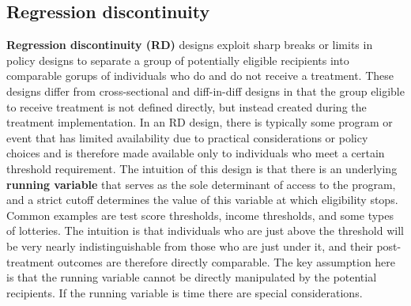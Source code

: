 \subsection{Regression discontinuity}

\textbf{Regression discontinuity (RD)} designs exploit sharp breaks or limits
in policy designs to separate a group of potentially eligible recipients
into comparable gorups of individuals who do and do not receive a treatment.
These designs differ from cross-sectional and diff-in-diff designs
in that the group eligible to receive treatment is not defined directly,
but instead created during the treatment implementation.
In an RD design, there is typically some program or event
that has limited availability due to practical considerations or policy choices
and is therefore made available only to individuals who meet a certain threshold requirement.
The intuition of this design is that there is an underlying \textbf{running variable}
that serves as the sole determinant of access to the program,
and a strict cutoff determines the value of this variable at which eligibility stops.\cite{imbens2008regression}
Common examples are test score thresholds, income thresholds, and some types of lotteries.
The intuition is that individuals who are just above the threshold
will be very nearly indistinguishable from those who are just under it,
and their post-treatment outcomes are therefore directly comparable.\cite{lee2010regression}
The key assumption here is that the running variable cannot be directly manipulated
by the potential recipients.
If the running variable is time there are special considerations.\cite{hausman2018regression}

